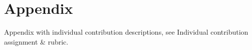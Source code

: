 \section{Appendix}

Appendix with individual contribution descriptions, see Individual contribution assignment \& rubric.